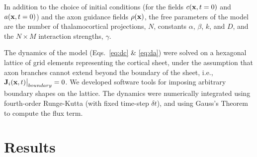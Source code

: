 \documentclass[9pt,twocolumn,twoside,lineno]{pnas-new}
\begin{document}
In addition to the choice of initial conditions (for the fields
$c(\mathbf{x},t=0)$ and $a(\mathbf{x},t=0)$) and the axon guidance fields
$\rho(\mathbf{x})$, the free parameters of the model are the number of
thalamocortical projections, $N$, constants $\alpha$, $\beta$, $k$, and $D$,
and the $N\times M$ interaction strengths, $\gamma$.

The dynamics of the model (Eqs.~\ref{eq:dc} \& \ref{eq:da}) were solved on a
hexagonal lattice of grid elements representing the cortical sheet, under the
assumption that axon branches cannot extend beyond the boundary of the sheet,
i.e., $\mathbf{J}_i(\mathbf{x},t) \big\rvert_{boundary} = 0$. We developed software
tools for imposing arbitrary boundary shapes on the lattice. The dynamics were
numerically integrated using fourth-order Runge-Kutta (with fixed time-step
${\delta}t$), and using Gauss's Theorem to compute the flux term.

\section*{Results}
\end{document}
